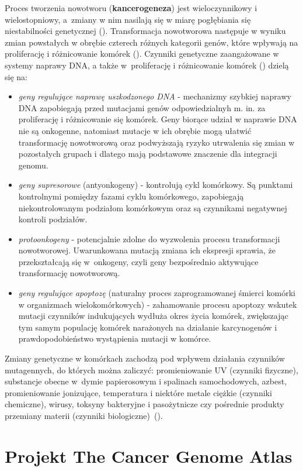 Proces tworzenia nowotworu (\textbf{kancerogeneza}) jest wieloczynnikowy i wielostopniowy, a~zmiany w nim nasilają się w miarę pogłębiania się niestabilności genetycznej (\cite{zikula2}). Transformacja nowotworowa następuje w wyniku zmian powstałych w obrębie czterech różnych kategorii genów, które wpływają na proliferację i różnicowanie komórek (\cite{zikula}). Czynniki genetyczne zaangażowane w systemy naprawy DNA, a także w~proliferację i różnicowanie komórek (\cite{zikula4}) dzielą się na:  
\begin{itemize}
\item \textit{geny regulujące naprawę uszkodzonego DNA} - mechanizmy szybkiej naprawy DNA zapobiegają przed mutacjami genów odpowiedzialnyh m. in. za proliferację i różnicowanie się komórek. Geny biorące udział w naprawie DNA nie są onkogenne, natomiast mutacje w ich obrębie mogą ułatwić transformację nowotworową oraz podwyższają ryzyko utrwalenia się zmian w pozostałych grupach i dlatego mają podstawowe znaczenie dla integracji genomu.
\item \textit{geny supresorowe} (antyonkogeny) - kontrolują cykl komórkowy. Są punktami kontrolnymi pomiędzy fazami cyklu komórkowego, zapobiegają niekontrolowanym podziałom komórkowym oraz są czynnikami negatywnej kontroli podziałów.
\item \textit{protoonkogeny} - potencjalnie zdolne do wyzwolenia procesu transformacji nowotworowej. Uwarunkowana mutacją zmiana ich ekspresji sprawia, że przekształcają się w~onkogeny, czyli geny bezpośrednio aktywujące transformację nowotworową.
\item \textit{geny regulujące apoptozę} (naturalny proces zaprogramowanej śmierci komórki w organizmach wielokomórkowych) - zahamowanie procesu apoptozy wskutek mutacji czynników indukujących wydłuża okres życia komórek, zwiększając tym samym populację komórek narażonych na działanie karcynogenów i prawdopodobieństwo wystąpienia mutacji w komórce.
\end{itemize}
Zmiany genetyczne w komórkach zachodzą pod wpływem działania czynników mutagennych, do których można zaliczyć: promieniowanie UV (czynniki fizyczne), substancje obecne w~dymie papierosowym i spalinach samochodowych, azbest, promieniowanie jonizujące, temperatura i niektóre metale ciężkie (czynniki chemiczne), wirusy, toksyny bakteryjne i pasożytnicze czy pośrednie produkty przemiany materii (czynniki biologiczne)~(\cite{zikula3}).


\section{Projekt The Cancer Genome Atlas}\label{chan:TCGA}


